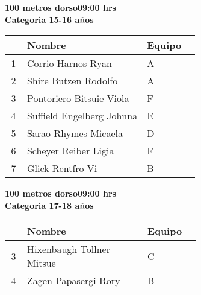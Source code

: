 \begin{minipage}{0.95\linewidth}\vspace{0.5cm} 
\begin{flushleft}
\textbf{
\hspace{-0.15cm}100 metros dorso\hspace{1.5cm}09:00 hrs \\Categoria 15-16 años}\vspace{-0.2cm} 
\end{flushleft}
\begin{tabular}{cp{0.63\linewidth}l}
\hline
& \textbf{Nombre} & \textbf{Equipo} \\ \hline
1 & Corrio Harnos Ryan & A \\ 
2 & Shire Butzen Rodolfo & A \\ 
3 & Pontoriero Bitsuie Viola & F \\ 
4 & Suffield Engelberg Johnna & E \\ 
5 & Sarao Rhymes Micaela & D \\ 
6 & Scheyer Reiber Ligia & F \\ 
7 & Glick Rentfro Vi & B \\ 
\end{tabular}
\end{minipage}
\begin{minipage}{0.95\linewidth}\vspace{0.5cm} 
\begin{flushleft}
\textbf{
\hspace{-0.15cm}100 metros dorso\hspace{1.5cm}09:00 hrs \\Categoria 17-18 años}\vspace{-0.2cm} 
\end{flushleft}
\begin{tabular}{cp{0.63\linewidth}l}
\hline
& \textbf{Nombre} & \textbf{Equipo} \\ \hline
3 & Hixenbaugh Tollner Mitsue & C \\ 
4 & Zagen Papasergi Rory & B \\ 
\end{tabular}
\end{minipage}
